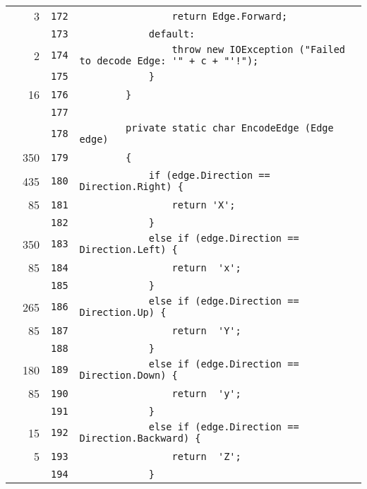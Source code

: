 \documentclass[a4paper,10pt]{article}
\begin{document}
\begin{longtable}[l]{lrrl}
\cellcolor{green} & 3 & \verb~172~ & \verb~                return Edge.Forward;~\\
\cellcolor{gray} &  & \verb~173~ & \verb~            default:~\\
\cellcolor{green} & 2 & \verb~174~ & \verb~                throw new IOException ("Failed to decode Edge: '" + c + "'!");~\\
\cellcolor{gray} &  & \verb~175~ & \verb~            }~\\
\cellcolor{green} & 16 & \verb~176~ & \verb~        }~\\
\cellcolor{gray} &  & \verb~177~ & \verb~~\\
\cellcolor{gray} &  & \verb~178~ & \verb~        private static char EncodeEdge (Edge edge)~\\
\cellcolor{green} & 350 & \verb~179~ & \verb~        {~\\
\cellcolor{green} & 435 & \verb~180~ & \verb~            if (edge.Direction == Direction.Right) {~\\
\cellcolor{green} & 85 & \verb~181~ & \verb~                return 'X';~\\
\cellcolor{gray} &  & \verb~182~ & \verb~            }~\\
\cellcolor{green} & 350 & \verb~183~ & \verb~            else if (edge.Direction == Direction.Left) {~\\
\cellcolor{green} & 85 & \verb~184~ & \verb~                return  'x';~\\
\cellcolor{gray} &  & \verb~185~ & \verb~            }~\\
\cellcolor{green} & 265 & \verb~186~ & \verb~            else if (edge.Direction == Direction.Up) {~\\
\cellcolor{green} & 85 & \verb~187~ & \verb~                return  'Y';~\\
\cellcolor{gray} &  & \verb~188~ & \verb~            }~\\
\cellcolor{green} & 180 & \verb~189~ & \verb~            else if (edge.Direction == Direction.Down) {~\\
\cellcolor{green} & 85 & \verb~190~ & \verb~                return  'y';~\\
\cellcolor{gray} &  & \verb~191~ & \verb~            }~\\
\cellcolor{green} & 15 & \verb~192~ & \verb~            else if (edge.Direction == Direction.Backward) {~\\
\cellcolor{green} & 5 & \verb~193~ & \verb~                return  'Z';~\\
\cellcolor{gray} &  & \verb~194~ & \verb~            }~\\

\end{longtable}
\end{document}
